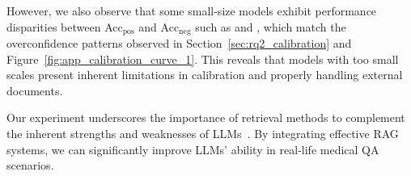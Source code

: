However, we also observe that some small-size models exhibit performance disparities between Acc$_\text{pos}$ and Acc$_\text{neg}$ such as \qwena and \llamac, which match the overconfidence patterns observed in Section~\ref{sec:rq2_calibration} and Figure~\ref{fig:app_calibration_curve_1}.
This reveals that models with too small scales present inherent limitations in calibration and properly handling external documents.

Our experiment underscores the importance of retrieval methods to complement the inherent strengths and weaknesses of LLMs~\cite{chen2024benchmarking}. 
By integrating effective RAG systems, we can significantly improve LLMs' ability in real-life medical QA scenarios.



